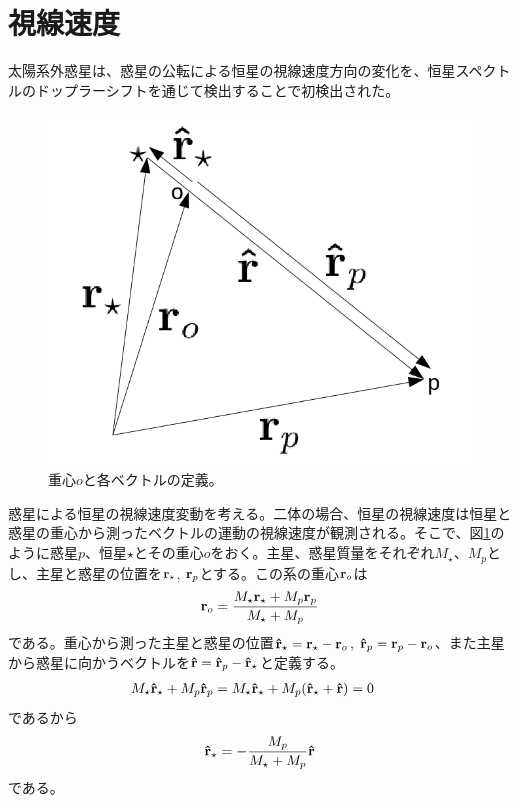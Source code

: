 \section{視線速度}

太陽系外惑星は、惑星の公転による恒星の視線速度方向の変化を、恒星スペクトルのドップラーシフトを通じて検出することで初検出された。

\begin{figure}[]
 \begin{center}
	\includegraphics[bb=0 0 648 537,width=1.0\linewidth]{fig/rvector.png}
\end{center}
	\caption{重心$o$と各ベクトルの定義。\label{fig:rvector}}
\end{figure} 

惑星による恒星の視線速度変動を考える。二体の場合、恒星の視線速度は恒星と惑星の重心から測ったベクトルの運動の視線速度が観測される。そこで、図\ref{fig:rvector}のように惑星$p$、恒星$\star$とその重心$o$をおく。主星、惑星質量をそれぞれ$M_\star$、$M_p$とし、主星と惑星の位置を${\bf r}_\star$, ${\bf r}_p$とする。この系の重心${\bf r}_o$は
\begin{eqnarray}
{\bf r}_o = \frac{M_\star {\bf r}_\star+ M_p {\bf r}_p}{M_\star + M_p}
\label{eq:rbary}
\end{eqnarray}
である。重心から測った主星と惑星の位置${\bf \hat{r}}_\star = {\bf r}_\star - {\bf r}_o$, ${\bf \hat{r}}_p = {\bf r}_p - {\bf r}_o$、また主星から惑星に向かうベクトルを${\bf \hat{r}} = {\bf \hat{r}}_p - {\bf \hat{r}}_\star $と定義する。
\begin{align}
\label{eq:barycentsp}
M_\star {\bf \hat{r}}_\star + M_p {\bf \hat{r}}_p &= M_\star {\bf \hat{r}}_\star + M_p ({\bf \hat{r}}_\star + {\bf \hat{r}} ) = 0 
\end{align}
であるから
\begin{eqnarray}
\label{eq:relpossp}
{\bf \hat{r}}_\star = - \frac{M_p}{M_\star + M_p} {\bf \hat{r}}
\end{eqnarray}
である。


